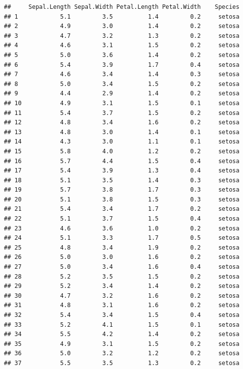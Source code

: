 \documentclass[
]{book}
\begin{document}
\begin{verbatim}
##     Sepal.Length Sepal.Width Petal.Length Petal.Width    Species
## 1            5.1         3.5          1.4         0.2     setosa
## 2            4.9         3.0          1.4         0.2     setosa
## 3            4.7         3.2          1.3         0.2     setosa
## 4            4.6         3.1          1.5         0.2     setosa
## 5            5.0         3.6          1.4         0.2     setosa
## 6            5.4         3.9          1.7         0.4     setosa
## 7            4.6         3.4          1.4         0.3     setosa
## 8            5.0         3.4          1.5         0.2     setosa
## 9            4.4         2.9          1.4         0.2     setosa
## 10           4.9         3.1          1.5         0.1     setosa
## 11           5.4         3.7          1.5         0.2     setosa
## 12           4.8         3.4          1.6         0.2     setosa
## 13           4.8         3.0          1.4         0.1     setosa
## 14           4.3         3.0          1.1         0.1     setosa
## 15           5.8         4.0          1.2         0.2     setosa
## 16           5.7         4.4          1.5         0.4     setosa
## 17           5.4         3.9          1.3         0.4     setosa
## 18           5.1         3.5          1.4         0.3     setosa
## 19           5.7         3.8          1.7         0.3     setosa
## 20           5.1         3.8          1.5         0.3     setosa
## 21           5.4         3.4          1.7         0.2     setosa
## 22           5.1         3.7          1.5         0.4     setosa
## 23           4.6         3.6          1.0         0.2     setosa
## 24           5.1         3.3          1.7         0.5     setosa
## 25           4.8         3.4          1.9         0.2     setosa
## 26           5.0         3.0          1.6         0.2     setosa
## 27           5.0         3.4          1.6         0.4     setosa
## 28           5.2         3.5          1.5         0.2     setosa
## 29           5.2         3.4          1.4         0.2     setosa
## 30           4.7         3.2          1.6         0.2     setosa
## 31           4.8         3.1          1.6         0.2     setosa
## 32           5.4         3.4          1.5         0.4     setosa
## 33           5.2         4.1          1.5         0.1     setosa
## 34           5.5         4.2          1.4         0.2     setosa
## 35           4.9         3.1          1.5         0.2     setosa
## 36           5.0         3.2          1.2         0.2     setosa
## 37           5.5         3.5          1.3         0.2     setosa

\end{verbatim}
\end{document}

